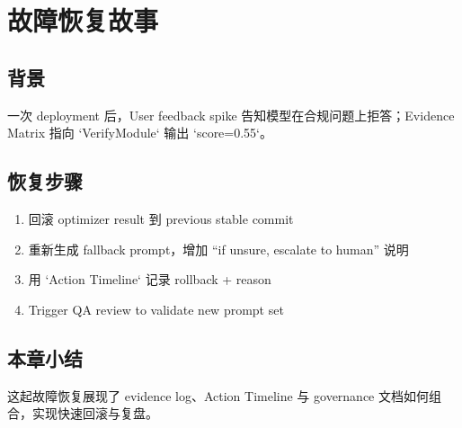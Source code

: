 \section{故障恢复故事}

\subsection{背景}

一次 deployment 后，User feedback spike 告知模型在合规问题上拒答；Evidence Matrix 指向 `VerifyModule` 输出 `score=0.55`。

\subsection{恢复步骤}

\begin{enumerate}
    \item 回滚 optimizer result 到 previous stable commit
    \item 重新生成 fallback prompt，增加 ``if unsure, escalate to human'' 说明
    \item 用 `Action Timeline` 记录 rollback + reason
    \item Trigger QA review to validate new prompt set
\end{enumerate}

\subsection{本章小结}

这起故障恢复展现了 evidence log、Action Timeline 与 governance 文档如何组合，实现快速回滚与复盘。

